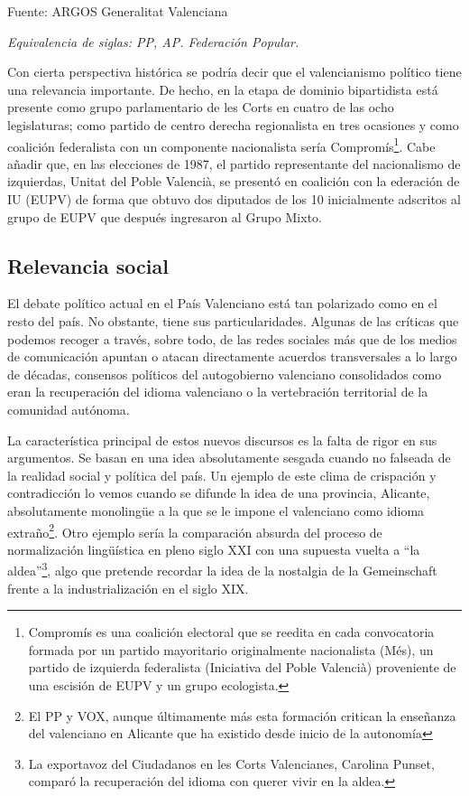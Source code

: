 \documentclass[
]{article}
\begin{document}
Fuente: ARGOS Generalitat Valenciana

\emph{Equivalencia de siglas: PP, AP. Federación Popular.}

Con cierta perspectiva histórica se podría decir que el valencianismo
político tiene una relevancia importante. De hecho, en la etapa de
dominio bipartidista está presente como grupo parlamentario de les Corts
en cuatro de las ocho legislaturas; como partido de centro derecha
regionalista en tres ocasiones y como coalición federalista con un
componente nacionalista sería Compromís\footnote{Compromís es una
  coalición electoral que se reedita en cada convocatoria formada por un
  partido mayoritario originalmente nacionalista (Més), un partido de
  izquierda federalista (Iniciativa del Poble Valencià) proveniente de
  una escisión de EUPV y un grupo ecologista.}. Cabe añadir que, en las
elecciones de 1987, el partido representante del nacionalismo de
izquierdas, Unitat del Poble Valencià, se presentó en coalición con la
ederación de IU (EUPV) de forma que obtuvo dos diputados de los 10
inicialmente adscritos al grupo de EUPV que después ingresaron al Grupo
Mixto.

\hypertarget{relevancia-social}{%
\subsection{Relevancia social}\label{relevancia-social}}

El debate político actual en el País Valenciano está tan polarizado como
en el resto del país. No obstante, tiene sus particularidades. Algunas
de las críticas que podemos recoger a través, sobre todo, de las redes
sociales más que de los medios de comunicación apuntan o atacan
directamente acuerdos transversales a lo largo de décadas, consensos
políticos del autogobierno valenciano consolidados como eran la
recuperación del idioma valenciano o la vertebración territorial de la
comunidad autónoma.

La característica principal de estos nuevos discursos es la falta de
rigor en sus argumentos. Se basan en una idea absolutamente sesgada
cuando no falseada de la realidad social y política del país. Un ejemplo
de este clima de crispación y contradicción lo vemos cuando se difunde
la idea de una provincia, Alicante, absolutamente monolingüe a la que se
le impone el valenciano como idioma extraño\footnote{El PP y VOX, aunque
  últimamente más esta formación critican la enseñanza del valenciano en
  Alicante que ha existido desde inicio de la autonomía}. Otro ejemplo
sería la comparación absurda del proceso de normalización lingüística en
pleno siglo XXI con una supuesta vuelta a ``la aldea''\footnote{La
  exportavoz del Ciudadanos en les Corts Valencianes, Carolina Punset,
  comparó la recuperación del idioma con querer vivir en la aldea.},
algo que pretende recordar la idea de la nostalgia de la Gemeinschaft
frente a la industrialización en el siglo XIX.
\end{document}
